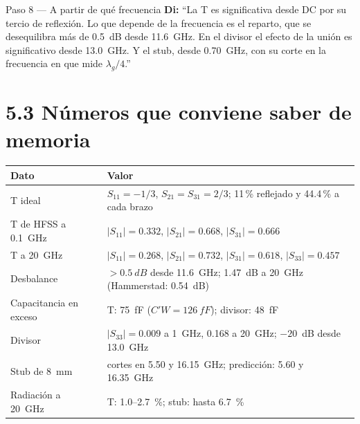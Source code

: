\documentclass[11pt,letterpaper]{article}
\begin{document}
\begin{paso}{Paso 8 --- A partir de qué frecuencia}
\textbf{Di:} ``La T es significativa desde DC por su tercio de reflexión. Lo que depende de la frecuencia es el reparto, que se desequilibra más de \SI{0.5}{dB} desde \SI{11.6}{GHz}. En el divisor el efecto de la unión es significativo desde \SI{13.0}{GHz}. Y el stub, desde \SI{0.70}{GHz}, con su corte en la frecuencia en que mide $\lambda_g/4$.''
\end{paso}

\section*{5.3 Números que conviene saber de memoria}
\begin{center}
\small
\begin{tabular}{ll}
\toprule
Dato & Valor \\
\midrule
T ideal & $S_{11}=-1/3$, $S_{21}=S_{31}=2/3$; 11\,\% reflejado y 44.4\,\% a cada brazo \\
T de HFSS a \SI{0.1}{GHz} & $|S_{11}|=0.332$, $|S_{21}|=0.668$, $|S_{31}|=0.666$ \\
T a \SI{20}{GHz} & $|S_{11}|=0.268$, $|S_{21}|=0.732$, $|S_{31}|=0.618$, $|S_{33}|=0.457$ \\
Desbalance & $>\SI{0.5}{dB}$ desde \SI{11.6}{GHz}; \SI{1.47}{dB} a \SI{20}{GHz} (Hammerstad: \SI{0.54}{dB}) \\
Capacitancia en exceso & T: \SI{75}{fF} ($C'W=\SI{126}{fF}$); divisor: \SI{48}{fF} \\
Divisor & $|S_{33}|=0.009$ a \SI{1}{GHz}, 0.168 a \SI{20}{GHz}; $-20$~dB desde \SI{13.0}{GHz} \\
Stub de \SI{8}{mm} & cortes en \SI{5.50}{} y \SI{16.15}{GHz}; predicción: \SI{5.60}{} y \SI{16.35}{GHz} \\
Radiación a \SI{20}{GHz} & T: \SI{1.0}{}--\SI{2.7}{\percent}; stub: hasta \SI{6.7}{\percent} \\
\bottomrule
\end{tabular}
\end{center}
\end{document}
